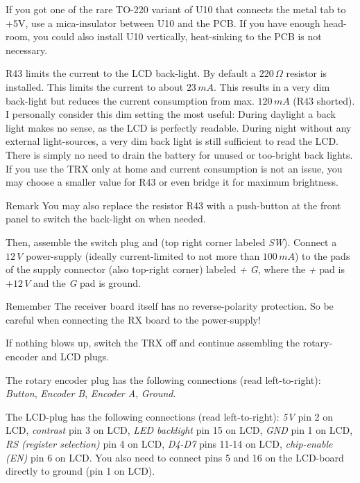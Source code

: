 \documentclass[10pt, a4paper,twoside,openright]{scrartcl}
\newenvironment{remember}{\begin{bclogo}[couleur=blue!30,arrondi=.1,logo=\bccrayon,ombre=true]{Remember}}{\end{bclogo}}
\newenvironment{remark}{\begin{bclogo}[couleur=blue!30,arrondi=.1,logo=\bcinfo,ombre=true]{Remark}}{\end{bclogo}}
\begin{document}
If you got one of the rare TO-220 variant of U10 that connects the metal tab to +5V, use a mica-insulator between U10 and the PCB. If you have enough head-room, you could also install U10 vertically, heat-sinking to the PCB is not necessary.

 R43 limits the current to the LCD back-light. By default a $220\,\Omega$ resistor is installed. This limits the current to about $23\,mA$. This results in a very dim back-light but reduces the current consumption from max. $120\, mA$ (R43 shorted). I personally consider this dim setting the most useful: During daylight a back light makes no sense, as the LCD is perfectly readable. During night without any external light-sources, a very dim back light is still sufficient to read the LCD. There is simply no need to drain the battery for unused or too-bright back lights. If you use the TRX only at home and current consumption is not an issue, you may choose a smaller value for R43 or even bridge it for maximum brightness.
 
\begin{remark} 
 You may also replace the resistor R43 with a push-button at the front panel to switch the back-light on when needed.
\end{remark}
 
 Then, assemble the switch plug and (top right corner labeled \emph{SW}). Connect a $12\,V$ power-supply (ideally current-limited to not more than $100\,mA$) to the pads of the supply connector (also top-right corner) labeled \emph{+ G}, where the \emph{+} pad is $+12\,V$ and the \emph{G} pad is ground. 

\begin{remember}
 The receiver board itself has no reverse-polarity protection. So be careful when connecting the RX board to the power-supply!
\end{remember}
  
 If nothing blows up, switch the TRX off and continue assembling the rotary-encoder and LCD plugs. 
 
 The rotary encoder plug has the following connections (read left-to-right): \emph{Button}, \emph{Encoder B}, \emph{Encoder A}, \emph{Ground}. 

 The LCD-plug has the following connections (read left-to-right): \emph{5V} pin 2 on LCD, \emph{contrast} pin 3 on LCD, \emph{LED backlight} pin 15 on LCD, \emph{GND} pin 1 on LCD, \emph{RS (register selection)} pin 4 on LCD, \emph{D4-D7} pins 11-14 on LCD, \emph{chip-enable (EN)} pin 6 on LCD. You also need to connect pins 5 and 16 on the LCD-board directly to ground (pin 1 on LCD).
 
\end{document}
